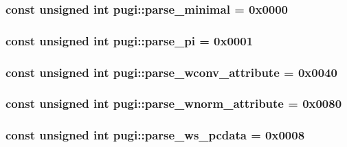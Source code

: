 \hypertarget{namespacepugi_ae5058761cfd25d6cdb7e092659dae1fd}{
\subsubsection[{parse\-\_\-minimal}]{\setlength{\rightskip}{0pt plus 5cm}const unsigned int pugi\-::parse\-\_\-minimal = 0x0000}}\label{namespacepugi_ae5058761cfd25d6cdb7e092659dae1fd}
\hypertarget{namespacepugi_a8fb7ea408d60b4f2ca79dd30b651f545}{
\subsubsection[{parse\-\_\-pi}]{\setlength{\rightskip}{0pt plus 5cm}const unsigned int pugi\-::parse\-\_\-pi = 0x0001}}\label{namespacepugi_a8fb7ea408d60b4f2ca79dd30b651f545}
\hypertarget{namespacepugi_a1e943812f2de36fc3ee14f7756afdbd7}{
\subsubsection[{parse\-\_\-wconv\-\_\-attribute}]{\setlength{\rightskip}{0pt plus 5cm}const unsigned int pugi\-::parse\-\_\-wconv\-\_\-attribute = 0x0040}}\label{namespacepugi_a1e943812f2de36fc3ee14f7756afdbd7}
\hypertarget{namespacepugi_a8617ea5ba78c676aff8b7af960cb2f4b}{
\subsubsection[{parse\-\_\-wnorm\-\_\-attribute}]{\setlength{\rightskip}{0pt plus 5cm}const unsigned int pugi\-::parse\-\_\-wnorm\-\_\-attribute = 0x0080}}\label{namespacepugi_a8617ea5ba78c676aff8b7af960cb2f4b}
\hypertarget{namespacepugi_ae492a24302294f1ce3fbd56f2edbf131}{
\subsubsection[{parse\-\_\-ws\-\_\-pcdata}]{\setlength{\rightskip}{0pt plus 5cm}const unsigned int pugi\-::parse\-\_\-ws\-\_\-pcdata = 0x0008}}\label{namespacepugi_ae492a24302294f1ce3fbd56f2edbf131}

